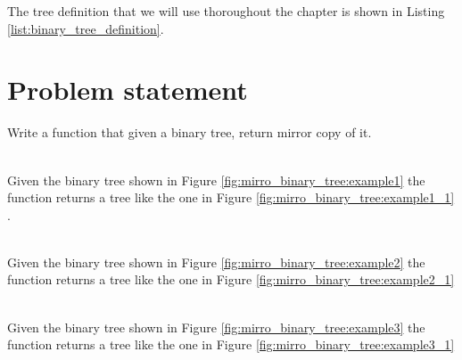The tree definition that we will use thoroughout the chapter is shown in Listing \ref{list:binary_tree_definition}.


\section{Problem statement}
\begin{exercise}
	Write a function that given a binary tree, return mirror copy of it.

	\begin{example}
		\hfill \\
		Given the binary tree shown in Figure \ref{fig:mirro_binary_tree:example1} the function
		returns a tree like the one in Figure \ref{fig:mirro_binary_tree:example1_1}
		\label{ex:mirro_binary_tree:example1}.
	\end{example}

	\begin{example}
		\hfill \\
		Given the binary tree shown in Figure \ref{fig:mirro_binary_tree:example2} the function
		returns a tree like the one in Figure \ref{fig:mirro_binary_tree:example2_1}
		\label{ex:mirro_binary_tree:example2}
	\end{example}

	\begin{example}
		\hfill \\
		Given the binary tree shown in Figure \ref{fig:mirro_binary_tree:example3} the function
		returns a tree like the one in Figure \ref{fig:mirro_binary_tree:example3_1}
		\label{ex:mirro_binary_tree:example3}
	\end{example}
\end{exercise}


